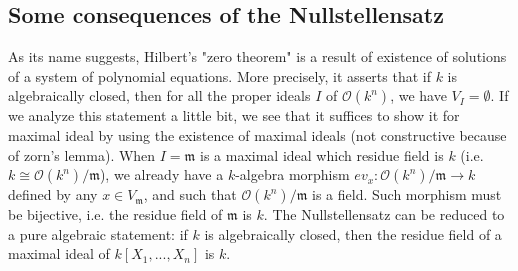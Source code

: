 \documentclass[12pt,a4paper,english]{article}
\theoremstyle{plain}
\theoremstyle{definition}
\theoremstyle{remark}
\begin{document}
\subsection{Some consequences of the Nullstellensatz}
As its name suggests, Hilbert's "zero theorem" is a result of existence of solutions of a system of polynomial equations. More precisely, it asserts that if $k$ is algebraically closed, then for all the proper ideals $I$ of $\mathcal{O}(k^{n})$, we have $V_{I}=\emptyset$. If we analyze this statement a little bit, we see that it suffices to show it for maximal ideal by using the existence of maximal ideals (not constructive because of zorn's lemma). When $I=\mathfrak{m}$ is a maximal ideal which residue field is $k$ (i.e. $k\cong \mathcal{O}(k^{n})/\mathfrak{m}$), we already have a $k$-algebra morphism $ev_{x}:\mathcal{O}(k^{n})/\mathfrak{m}\rightarrow k$ defined by any $x\in V_{\mathfrak{m}}$, and such that $\mathcal{O}(k^{n})/\mathfrak{m}$ is a field. Such morphism must be bijective, i.e. the residue field of $\mathfrak{m}$ is $k$. The Nullstellensatz can be reduced to a pure algebraic statement: if $k$ is algebraically closed, then the residue field of a maximal ideal of $k[X_{1},...,X_{n}]$ is $k$. 
\end{document}

